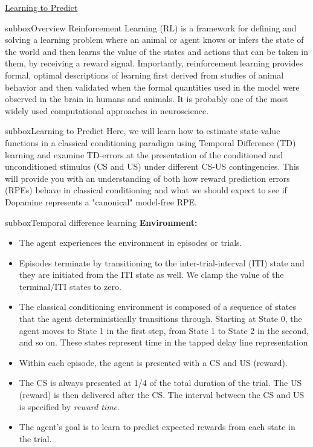 \begin{textbox}{\href{https://compneuro.neuromatch.io/tutorials/W3D4_ReinforcementLearning/student/W3D4_Tutorial1.html}{Learning to Predict } }
\begin{subbox}{subbox}{Overview}
\scriptsize
Reinforcement Learning (RL) is a framework for defining and solving a learning problem where an animal or agent knows or infers the state of the world and then learns the value of the states and actions that can be taken in them, by receiving a reward signal. Importantly, reinforcement learning provides formal, optimal descriptions of learning first derived from studies of animal behavior and then validated when the formal quantities used in the model were observed in the brain in humans and animals. It is probably one of the most widely used computational approaches in neuroscience.


\end{subbox}
\begin{subbox}{subbox}{Learning to Predict}
\scriptsize
Here, we will learn how to estimate state-value functions in a classical conditioning paradigm using Temporal Difference (TD) learning and examine TD-errors at the presentation of the conditioned and unconditioned stimulus (CS and US) under different CS-US contingencies. This will provide you with an understanding of both how reward prediction errors (RPEs) behave in classical conditioning and what we should expect to see if Dopamine represents a "canonical" model-free RPE. 

\end{subbox}

\begin{subbox}{subbox}{Temporal difference learning}
\scriptsize
\textbf{Environment:}
\begin{itemize}

\item The agent experiences the environment in episodes or trials. 
\item Episodes terminate by transitioning to the inter-trial-interval (ITI) state and they are initiated from the ITI state as well. We clamp the value of the terminal/ITI states to zero. 
\item The classical conditioning environment is composed of a sequence of states that the agent deterministically transitions through. Starting at State 0, the agent moves to State 1 in the first step, from State 1 to State 2 in the second, and so on.  These states represent time in the tapped delay line representation
\item Within each episode, the agent is presented with a CS and US (reward). 
\item The CS is always presented at 1/4 of the total duration of the trial. The US (reward) is then delivered after the CS. The interval between the CS and US is specified by \textit{reward time}.
\item The agent's goal is to learn to predict expected rewards from each state in the trial. 
\end{itemize}

\end{subbox}


\end{textbox}
